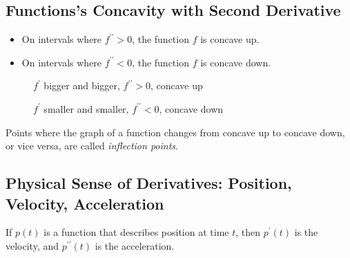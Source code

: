 \subsection{Functions's Concavity with Second Derivative}
\begin{itemize}
\item On intervals where $f^{\prime\prime}>0$, the function $f$ is concave up.
\item On intervals where $f^{\prime\prime}<0$, the function $f$ is concave down.
\end{itemize}
\begin{figure}[H]
  \centering
  \caption{$f^\prime$ bigger and bigger, $f^{\prime\prime}>0$, concave up}
\end{figure}
\begin{figure}[H]
  \centering
  \caption{$f^\prime$ smaller and smaller, $f^{\prime\prime}<0$, concave down}
\end{figure}
\begin{definition}
Points where the graph of a function changes from concave up to concave down, or vice versa, are called \textit{inflection points}.
\end{definition}

\subsection{Physical Sense of Derivatives: Position, Velocity, Acceleration}
If $p(t)$ is a function that describes position at time $t$, then $p^\prime(t)$ is the velocity, and $p^{\prime\prime}(t)$ is the acceleration.

